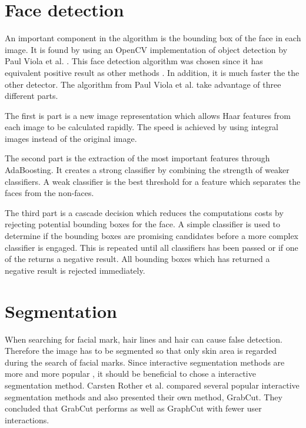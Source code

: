\section{Face detection}

An important component in the algorithm is the bounding box of the face in each image. It is found by using an OpenCV \cite{opencv} implementation of object detection by Paul Viola et al. \cite{face_detection}. This face detection algorithm was chosen since it has equivalent positive result as other methods \cite{face_detecion_comp,face_detecion_comp_2}. In addition, it is much faster the the other detector. The algorithm from Paul Viola et al. take advantage of three different parts. 

The first is part is a new image representation which allows Haar features from each image to be calculated rapidly. The speed is achieved by using integral images instead of the original image. 

The second part is the extraction of the most important features through AdaBoosting. It creates a strong classifier by combining the strength of weaker classifiers. A weak classifier is the best threshold for a feature which separates the faces from the non-faces.

The third part is a cascade decision which reduces the computations costs by rejecting potential bounding boxes for the face. A simple classifier is used to determine if the bounding boxes are promising candidates before a more complex classifier is engaged. This is repeated until all classifiers has been passed or if one of the returns a negative result. All bounding boxes which has returned a negative result is rejected immediately.  

\section{Segmentation}

When searching for facial mark, hair lines and hair can cause false detection. Therefore the image has to be segmented so that only skin area is regarded during the search of facial marks. Since interactive segmentation methods are more and more popular \cite{graphcut}, it should be beneficial to chose a interactive segmentation method. Carsten Rother et al.\cite{grabcut} compared several popular interactive segmentation methods and also presented their own method, GrabCut. They concluded that GrabCut performs as well as GraphCut \cite{graphcut} with fewer user interactions.

